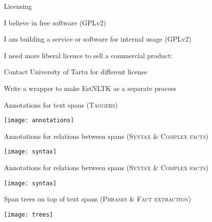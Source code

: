 \documentclass[landscape,footrule]{foils}
\begin{document}
Licensing
\begin{triangles}
\item I believe in free software (GPLv2)
\item I am building a service or software for internal usage (GPLv2)
\item I need more liberal licence to sell a commercial product:\vspace*{0.5ex}
\begin{diamonds}
\item Contact University of Tartu for different license
\item Write a wrapper to make EstNLTK as a separate process
\end{diamonds}
\end{triangles}


\begin{triangles}
\item Annotations for text spans (\textsc{Taggers})\\
\centerline{\texttt{[image: annotations]}}
\item Annotations for relations between spans (\textsc{Syntax} \& \textsc{Complex facts})\\
\centerline{\texttt{[image: syntax]}}
\end{triangles}


\begin{triangles}
\item Annotations for relations between spans (\textsc{Syntax} \& \textsc{Complex facts})\\
\centerline{\texttt{[image: syntax]}}
\item Span trees on top of text spans (\textsc{Phrases} \& \textsc{Fact extraction})\\
\centerline{\texttt{[image: trees]}}
\end{triangles}
\end{document}
